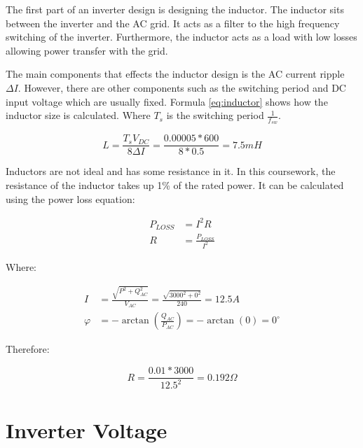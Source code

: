 \documentclass[12pt]{article}
\begin{document}
The first part of an inverter design is designing the inductor.
The inductor sits between the inverter and the AC grid.
It acts as a filter to the high frequency switching of the inverter.
Furthermore, the inductor acts as a load with low losses allowing power transfer with the grid.

The main components that effects the inductor design is the AC current ripple $\Delta{I}$.
However, there are other components such as the switching period and DC input voltage which are usually fixed.
Formula \ref{eq:inductor} shows how the inductor size is calculated.
Where $T_{s}$ is the switching period $\frac{1}{f_{sw}}$.

\begin{equation} \label{eq:inductor}
    L = \frac{T_{s} V_{DC}}{8 \Delta{I}} = \frac{0.00005 * 600}{8 * 0.5} = 7.5 mH
\end{equation}

Inductors are not ideal and has some resistance in it.
In this coursework, the resistance of the inductor takes up 1\% of the rated power.
It can be calculated using the power loss equation:

\begin{equation}
    \begin{aligned}
        P_{LOSS} & = I^{2} R                \\
        R        & = \frac{P_{LOSS}}{I^{2}}
    \end{aligned}
\end{equation}

Where:

\begin{equation} \label{eq:current-calculation}
    \begin{aligned}
        I       & = \frac{\sqrt{P^{2} + Q_{AC}^{2}}}{V_{AC}} = \frac{\sqrt{3000^{2} + 0^{2}}}{240} = 12.5 A \\
        \varphi & = -\arctan(\frac{Q_{AC}}{P_{AC}}) = -\arctan(0) = 0^{\circ{}}
    \end{aligned}
\end{equation}

Therefore:

\begin{equation}
    R = \frac{0.01 * 3000}{12.5^{2}} = 0.192 \Omega
\end{equation}

\section{Inverter Voltage}
\end{document}

